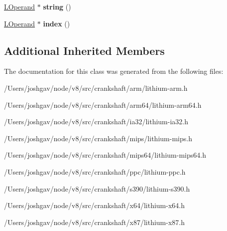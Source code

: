 \begin{DoxyCompactItemize}
\item 
\hyperlink{classv8_1_1internal_1_1_l_operand}{L\+Operand} $\ast$ {\bfseries string} ()\hypertarget{classv8_1_1internal_1_1_l_string_char_code_at_a935ea67cb0997a56225d8943bd28acfc}{}\label{classv8_1_1internal_1_1_l_string_char_code_at_a935ea67cb0997a56225d8943bd28acfc}

\item 
\hyperlink{classv8_1_1internal_1_1_l_operand}{L\+Operand} $\ast$ {\bfseries index} ()\hypertarget{classv8_1_1internal_1_1_l_string_char_code_at_a6d34721abedba9af5cdca55a18b388c2}{}\label{classv8_1_1internal_1_1_l_string_char_code_at_a6d34721abedba9af5cdca55a18b388c2}

\end{DoxyCompactItemize}
\subsection*{Additional Inherited Members}


The documentation for this class was generated from the following files\+:\begin{DoxyCompactItemize}
\item 
/\+Users/joshgav/node/v8/src/crankshaft/arm/lithium-\/arm.\+h\item 
/\+Users/joshgav/node/v8/src/crankshaft/arm64/lithium-\/arm64.\+h\item 
/\+Users/joshgav/node/v8/src/crankshaft/ia32/lithium-\/ia32.\+h\item 
/\+Users/joshgav/node/v8/src/crankshaft/mips/lithium-\/mips.\+h\item 
/\+Users/joshgav/node/v8/src/crankshaft/mips64/lithium-\/mips64.\+h\item 
/\+Users/joshgav/node/v8/src/crankshaft/ppc/lithium-\/ppc.\+h\item 
/\+Users/joshgav/node/v8/src/crankshaft/s390/lithium-\/s390.\+h\item 
/\+Users/joshgav/node/v8/src/crankshaft/x64/lithium-\/x64.\+h\item 
/\+Users/joshgav/node/v8/src/crankshaft/x87/lithium-\/x87.\+h\end{DoxyCompactItemize}
